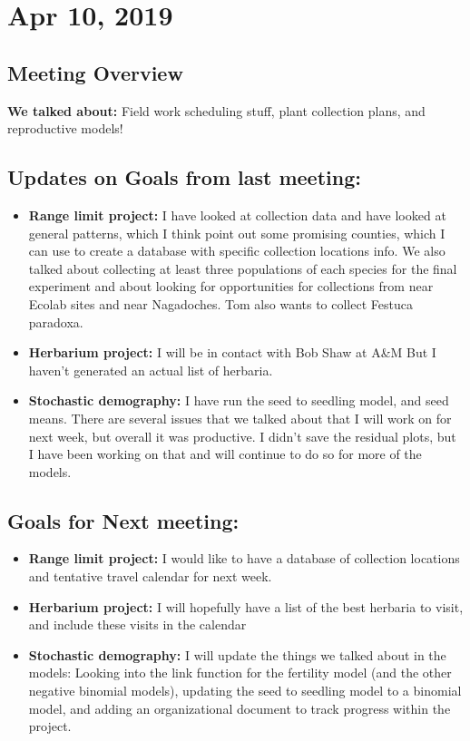 \documentclass{article}
\begin{document}
 
\section*{Apr 10, 2019}
\subsection*{Meeting Overview}
\textbf{We talked about:}
Field work scheduling stuff, plant collection plans, and reproductive models!

\subsection*{Updates on Goals from last meeting:}
\begin{itemize}
\item{\textbf{Range limit project:} I have looked at collection data and have looked at general patterns, which I think point out some promising counties, which I can use to create a database with specific collection locations info. We also talked about collecting at least three populations of each species for the final experiment and about looking for opportunities for collections from near Ecolab sites and near Nagadoches. Tom also wants to collect Festuca paradoxa.}
\item{\textbf{Herbarium project:} I will be in contact with Bob Shaw at A\&M But I haven't generated an actual list of herbaria.}
\item{\textbf{Stochastic demography:} I have run the seed to seedling model, and seed means. There are several issues that we talked about that I will work on for next week, but overall it was productive. I didn't save the residual plots, but I have been working on that and will continue to do so for more of the models.}
\end{itemize}

\subsection*{Goals for Next meeting:}
\begin{itemize}
\item{\textbf{Range limit project:} I would like to have a database of collection locations and  tentative travel calendar for next week.}
\item{\textbf{Herbarium project:} I will hopefully have a list of the best herbaria to visit, and include these visits in the calendar}
\item{\textbf{Stochastic demography:} I will update the things we talked about in the models: Looking into the link function for the fertility model (and the other negative binomial models), updating the seed to seedling model to a binomial model, and adding an organizational document to track progress within the project.}
\end{itemize}
 
\end{document}
